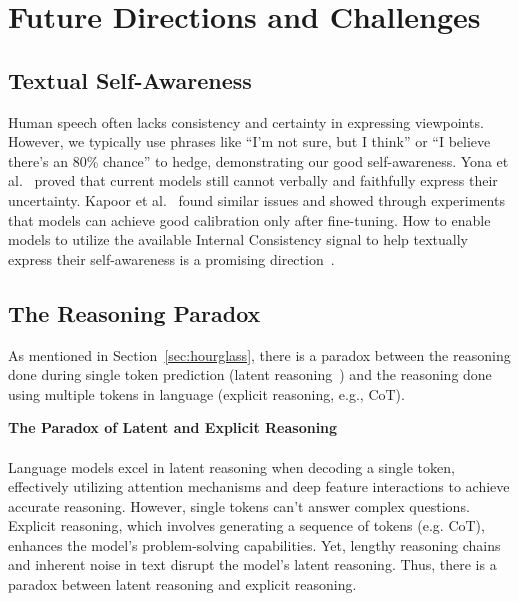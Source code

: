 \documentclass[lettersize,journal]{IEEEtran}
\begin{document}
\section{Future Directions and Challenges} \label{sec:future}


\subsection{Textual Self-Awareness}


\noindent Human speech often lacks consistency and certainty in expressing viewpoints. However, we typically use phrases like ``I'm not sure, but I think'' or ``I believe there's an 80\% chance'' to hedge, demonstrating our good self-awareness. Yona et al.~\cite{ExpressUncertainty_24_arXiv_TAU} proved that current models still cannot verbally and faithfully express their uncertainty. Kapoor et al.~\cite{MustTaught_24_arXiv_NYU} found similar issues and showed through experiments that models can achieve good calibration only after fine-tuning. How to enable models to utilize the available Internal Consistency signal to help textually express their self-awareness is a promising direction~\cite{ExpressKnowledge_24_arXiv_FDU}.


\subsection{The Reasoning Paradox}

\noindent As mentioned in Section~\ref{sec:hourglass}, there is a paradox between the reasoning done during single token prediction (latent reasoning~\cite{TheoryLatentReason_24_arXiv_Google}) and the reasoning done using multiple tokens in language (explicit reasoning, e.g., CoT).

\begin{tcolorbox}[colback=white!98!black,colframe=white!30!black,boxsep=1.1pt,top=6.75pt]%
\vspace{1.75pt}%
\textbf{The Paradox of Latent and Explicit Reasoning}\\[-0.575em]
\noindent\makebox[\textwidth]{\rule{\textwidth}{0.4pt}}
\\[0.25em]
Language models excel in latent reasoning when decoding a single token, effectively utilizing attention mechanisms and deep feature interactions to achieve accurate reasoning. However, single tokens can't answer complex questions. Explicit reasoning, which involves generating a sequence of tokens (e.g. CoT), enhances the model's problem-solving capabilities. Yet, lengthy reasoning chains and inherent noise in text disrupt the model's latent reasoning. Thus, there is a paradox between latent reasoning and explicit reasoning.
\end{tcolorbox}
\end{document}
